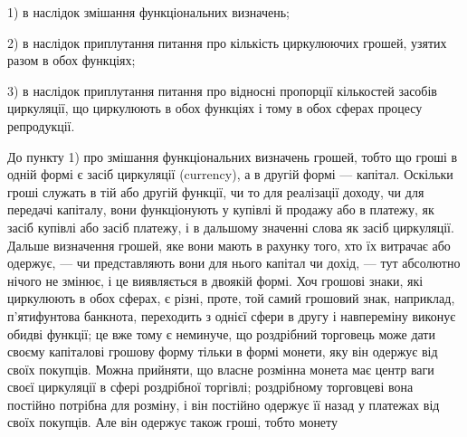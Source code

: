 1) в наслідок змішання функціональних визначень;

2) в наслідок приплутання питання про кількість циркулюючих грошей, узятих разом в обох функціях;

3) в наслідок приплутання питання про відносні пропорції
кількостей засобів циркуляції, що циркулюють в обох функціях
і тому в обох сферах процесу репродукції.

До пункту 1) про змішання функціональних визначень грошей, тобто що гроші в одній формі є засіб
циркуляції (currency),
а в другій формі — капітал. Оскільки гроші служать в тій або
другій функції, чи то для реалізації доходу, чи для передачі
капіталу, вони функціонують у купівлі й продажу або в платежу,
як засіб купівлі або засіб платежу, і в дальшому значенні
слова як засіб циркуляції. Дальше визначення грошей, яке вони
мають в рахунку того, хто їх витрачає або одержує, — чи представляють вони для нього капітал чи
дохід, — тут абсолютно нічого не змінює, і це виявляється в двоякій формі. Хоч грошові
знаки, які циркулюють в обох сферах, є різні, проте, той самий
грошовий знак, наприклад, п’ятифунтова банкнота, переходить
з однієї сфери в другу і навпереміну виконує обидві функції; це
вже тому є неминуче, що роздрібний торговець може дати
своєму капіталові грошову форму тільки в формі монети, яку
він одержує від своїх покупців. Можна прийняти, що власне
розмінна монета має центр ваги своєї циркуляції в сфері
роздрібної торгівлі; роздрібному торговцеві вона постійно потрібна для розміну, і він постійно
одержує її назад у платежах
від своїх покупців. Але він одержує також гроші, тобто монету
\parbreak{}  %
